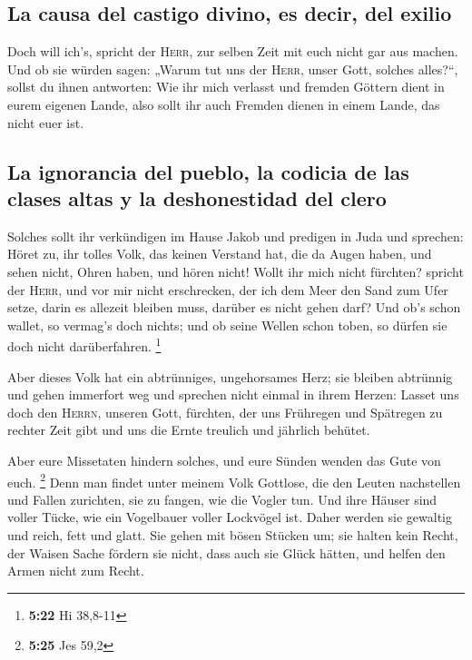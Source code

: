 \hypertarget{la-causa-del-castigo-divino-es-decir-del-exilio}{%
\subsection{La causa del castigo divino, es decir, del
exilio}\label{la-causa-del-castigo-divino-es-decir-del-exilio}}

 Doch will ich's, spricht der \textsc{Herr}, zur selben
Zeit mit euch nicht gar aus machen.  Und ob sie würden
sagen: „Warum tut uns der \textsc{Herr}, unser Gott, solches alles?{}``,
sollst du ihnen antworten: Wie ihr mich verlasst und fremden Göttern
dient in eurem eigenen Lande, also sollt ihr auch Fremden dienen in
einem Lande, das nicht euer ist.

\hypertarget{la-ignorancia-del-pueblo-la-codicia-de-las-clases-altas-y-la-deshonestidad-del-clero}{%
\subsection{La ignorancia del pueblo, la codicia de las clases altas y
la deshonestidad del
clero}\label{la-ignorancia-del-pueblo-la-codicia-de-las-clases-altas-y-la-deshonestidad-del-clero}}

 Solches sollt ihr verkündigen im Hause Jakob und
predigen in Juda und sprechen:  Höret zu, ihr tolles
Volk, das keinen Verstand hat, die da Augen haben, und sehen nicht,
Ohren haben, und hören nicht!  Wollt ihr mich nicht
fürchten? spricht der \textsc{Herr}, und vor mir nicht erschrecken, der
ich dem Meer den Sand zum Ufer setze, darin es allezeit bleiben muss,
darüber es nicht gehen darf? Und ob's schon wallet, so vermag's doch
nichts; und ob seine Wellen schon toben, so dürfen sie doch nicht
darüberfahren. \footnote{\textbf{5:22} Hi 38,8-11}

 Aber dieses Volk hat ein abtrünniges, ungehorsames Herz;
sie bleiben abtrünnig und gehen immerfort weg  und
sprechen nicht einmal in ihrem Herzen: Lasset uns doch den
\textsc{Herrn}, unseren Gott, fürchten, der uns Frühregen und Spätregen
zu rechter Zeit gibt und uns die Ernte treulich und jährlich behütet.

 Aber eure Missetaten hindern solches, und eure Sünden
wenden das Gute von euch. \footnote{\textbf{5:25} Jes 59,2}
 Denn man findet unter meinem Volk Gottlose, die den
Leuten nachstellen und Fallen zurichten, sie zu fangen, wie die Vogler
tun.  Und ihre Häuser sind voller Tücke, wie ein
Vogelbauer voller Lockvögel ist. Daher werden sie gewaltig und reich,
fett und glatt.  Sie gehen mit bösen Stücken um; sie
halten kein Recht, der Waisen Sache fördern sie nicht, dass auch sie
Glück hätten, und helfen den Armen nicht zum Recht.

